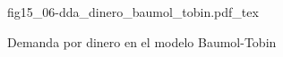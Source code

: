 \begin{figure}[h]
\centering
\def\svgwidth{0.75\textwidth}
{fig15_06-dda_dinero_baumol_tobin.pdf_tex}
\caption{Demanda por dinero en el modelo Baumol-Tobin}
\label{fig15_06-dda_dinero_baumol_tobin}
\end{figure}